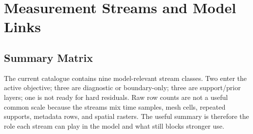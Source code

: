 \documentclass[10pt,a4paper]{article}
\begin{document}
\section{Measurement Streams and Model Links}

\subsection{Summary Matrix}

The current catalogue contains nine model-relevant stream classes.  Two enter the
active objective; three are diagnostic or boundary-only; three are support/prior
layers; one is not ready for hard residuals.  Raw row counts are not a useful
common scale because the streams mix time samples, mesh cells, repeated supports,
metadata rows, and spatial rasters.  The useful summary is therefore the role each
stream can play in the model and what still blocks stronger use.
\end{document}
